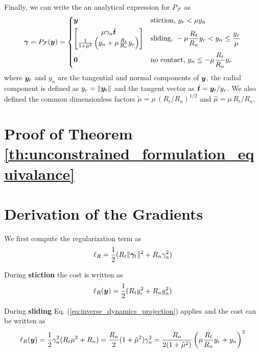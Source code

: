 Finally, we can write the an analytical expression for $P_\mathcal{F}$ as
\begin{equation}
	\bgamma = P_\mathcal{F}(\vf{y}) = 
\begin{dcases}
	\vf{y} 
	& \text{stiction, } y_r < \mu y_n\\
	\begin{bmatrix}
		\mu\gamma_n\hat{\vf{t}}\\
		\frac{1}{1+\tilde\mu^2}\left(y_n +
	\mu\frac{R_t}{R_n}y_r\right)
	\end{bmatrix}
	& \text{sliding, } -\mu \frac{R_t}{R_n} y_r < y_n \leq \frac{y_r}{\mu}\\
    \vf{0} & \text{no contact, } y_n \leq -\mu \frac{R_t}{R_n} y_r
\end{dcases}	  
	\label{eq:inverse_dynamics_projection}
\end{equation}
where ${\bm{y}}_t$ and $y_n$ are the tangential and normal components of ${\bm{y}}$,
the radial component is defined as $y_r=\Vert{\bm{y}}_t\Vert$ and the tangent
vector as $\hat{{\bm{t}}}={\bm{y}}_t/y_r$. We also defined the common dimensionless
factors $\tilde\mu=\mu\,(R_t/R_n)^{1/2}$ and $\hat\mu=\mu\,R_t/R_n$.


\section{Proof of Theorem \ref{th:unconstrained_formulation_equivalance}}
\label{app:unconstrained_formulation_equivalance}


\section{Derivation of the Gradients}
\label{app:gradients_derivation}

We first compute the regularization term as
\begin{eqnarray}
	\ell_R = \frac{1}{2}(R_t\Vert{\bm\gamma}_t\Vert^2+R_n\gamma_n^2)
\end{eqnarray}

During \textbf{stiction} the cost is written as
\begin{eqnarray}
	\ell_R({\bm{y}}) = \frac{1}{2}(R_t y_r^2+R_n y_n^2)
\end{eqnarray}

During \textbf{sliding} Eq. (\ref{eq:inverse_dynamics_projection}) applies and
the cost can be written as
\begin{eqnarray}
	\ell_R({\bm{y}}) =
	\frac{1}{2}\gamma_n^2(R_t\mu^2+R_n)=\frac{R_n}{2}(1+\tilde\mu^2)\gamma_n^2=\frac{R_n}{2(1+\tilde\mu^2)}\left(\mu\frac{R_t}{R_n}y_r+y_n\right)^2
\end{eqnarray}

